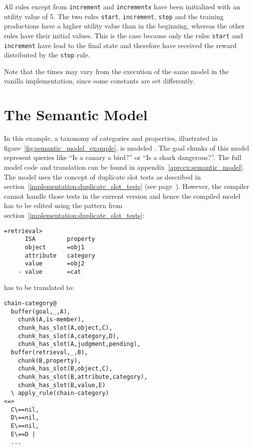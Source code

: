All rules except from \lstinline|increment| and \lstinline|incrementx| have been initialized with an utility value of 5. The two rules \lstinline|start|, \lstinline|increment|, \lstinline|stop| and the training productions have a higher utility value than in the beginning, whereas the other rules have their initial values. This is the case because only the rules \lstinline|start| and \lstinline|increment| have lead to the final state and therefore have received the reward distributed by the \lstinline|stop| rule.

Note that the times may vary from the execution of the same model in the vanilla implementation, since some constants are set differently.


\section{The Semantic Model}

In this example, a taxonomy of categories and properties, illustrated in figure~\ref{fig:semantic_model_example}, is modeled \cite[unit 1, pp. 24\psqq]{actr_tutorial}. The goal chunks of this model represent queries like ``Is a canary a bird?'' or ``Is a shark dangerous?''. The full model code and translation can be found in appendix~\ref{app:ex:semantic_model}. The model uses the concept of duplicate slot tests as described in section~\ref{implementation:duplicate_slot_tests} (see page~\pageref{implementation:duplicate_slot_tests}). However, the compiler cannot handle those tests in the current version and hence the compiled model has to be edited using the pattern from section~\ref{implementation:duplicate_slot_tests}:

\begin{lstlisting}
=retrieval>
      ISA         property
      object      =obj1
      attribute   category
      value       =obj2
    - value       =cat 
\end{lstlisting}

has to be translated to:

\begin{lstlisting}
chain-category@
  buffer(goal,_,A),
    chunk(A,is-member),
    chunk_has_slot(A,object,C),
    chunk_has_slot(A,category,D),
    chunk_has_slot(A,judgment,pending),
  buffer(retrieval,_,B),
    chunk(B,property),
    chunk_has_slot(B,object,C),
    chunk_has_slot(B,attribute,category),
    chunk_has_slot(B,value,E)
  \ apply_rule(chain-category) 
<=> 
  C\==nil,
  D\==nil,
  E\==nil,
  E\==D |
  ...
\end{lstlisting}

